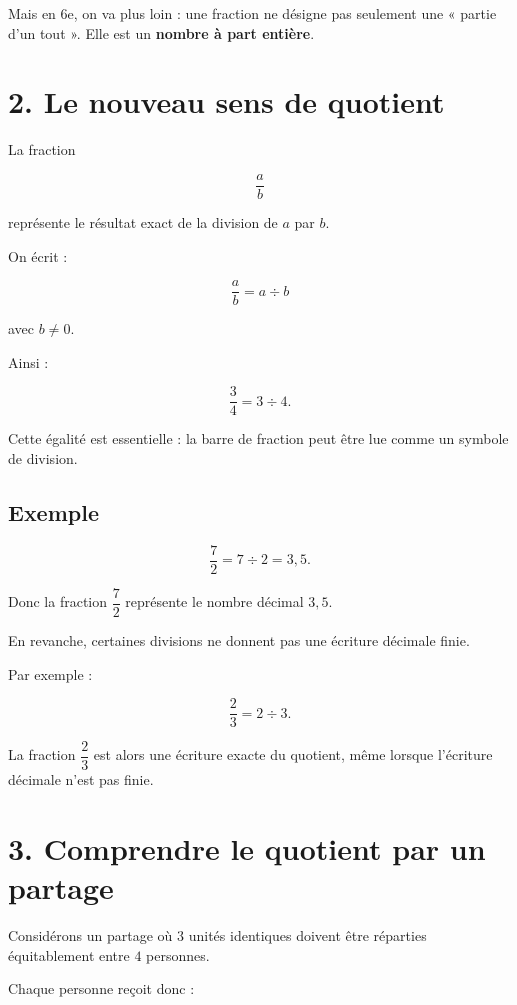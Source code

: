 Mais en 6e, on va plus loin : une fraction ne désigne pas seulement une « partie d’un tout ». Elle est un \textbf{nombre à part entière}.

\section{2. Le nouveau sens de quotient}

La fraction

\[
\dfrac{a}{b}
\]

représente le résultat exact de la division de $a$ par $b$.

On écrit :

\[
\boxed{\dfrac{a}{b}=a\div b}
\]

avec $b\neq0$.

Ainsi :

\[
\dfrac{3}{4}=3\div4.
\]

Cette égalité est essentielle : la barre de fraction peut être lue comme un symbole de division.

\subsection{Exemple}

\[
\dfrac{7}{2}=7\div2=3{,}5.
\]

Donc la fraction $\dfrac{7}{2}$ représente le nombre décimal $3{,}5$.

En revanche, certaines divisions ne donnent pas une écriture décimale finie.

Par exemple :

\[
\dfrac{2}{3}=2\div3.
\]

La fraction $\dfrac{2}{3}$ est alors une écriture exacte du quotient, même lorsque l’écriture décimale n’est pas finie.

\section{3. Comprendre le quotient par un partage}

Considérons un partage où $3$ unités identiques doivent être réparties équitablement entre $4$ personnes.


Chaque personne reçoit donc :

